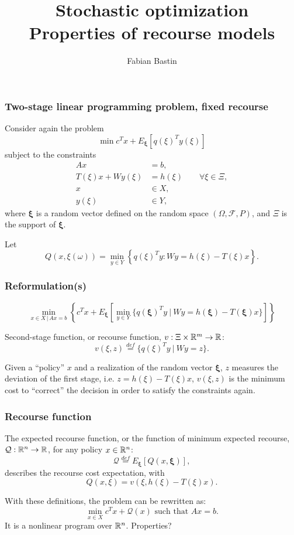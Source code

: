 \documentclass{beamer}
\title[Properties of recourse models]{Stochastic optimization\\Properties of recourse models}
\author{Fabian Bastin}
\date{}
\def\bxi{\boldsymbol\xi}
\def\bxi{\boldsymbol\xi}
\begin{document}
\frame{\titlepage}

\begin{frame}
\frametitle{Two-stage linear programming problem, fixed recourse}

Consider again the problem
\[
\min c^Tx + E_{\bxi}[q(\xi)^Ty(\xi)]
\]
subject to the constraints
\begin{align*}
Ax &= b, \\
T(\xi)x + Wy(\xi) &= h(\xi) \qquad \forall \xi \in \Xi, \\
x & \in X, \\
y(\xi) & \in Y,
\end{align*}
where $\bxi$ is a random vector defined on the random space 
$(\Omega, \mathcal{F}, P)$, and $\Xi$ is the support of $\bxi$.

\mbox{}

Let
\[
Q(x, \xi(\omega)) = \min_{y \in Y} \left\lbrace q(\xi)^Ty: Wy = h(\xi) - T(\xi)x \right\rbrace.
\]
\end{frame}

\begin{frame}
\frametitle{Reformulation(s)}

\[
\min_{x \in X \,|\, Ax = b} \left\lbrace c^Tx + E_{\bxi} \left[ \min_{y \in Y} \lbrace q(\bxi)^Ty \ |\ Wy = h(\bxi) - T(\bxi)x \rbrace \right] \right\rbrace 
\]

\mbox{}

Second-stage function, or recourse function, $v: \Xi \times \mathbb{R}^m \rightarrow \mathbb{R}$:
\[
v(\xi, z) \overset{def}{=} \lbrace q(\xi)^Ty \ |\ Wy = z \rbrace.
\]

Given a ``policy'' $x$ and a realization of the random vector $\bxi$, $z$ measures the deviation of the first stage, i.e. $z = h(\xi) - T(\xi)x$, $v(\xi, z)$ is the minimum cost to ``correct'' the decision in order to satisfy the constraints again.

\end{frame}

\begin{frame}
\frametitle{Recourse function}

The expected recourse function, or the function of minimum expected recourse, $\mathcal{Q}: \mathbb{R}^n \rightarrow \mathbb{R}$, for any policy $x \in \mathbb{R}^n$:
\[
\mathcal{Q} \overset{def}{=} E_{\bxi}[Q(x,\bxi)],
\]
describes the recourse cost expectation, with
\[
Q(x, \xi) = v(\xi, h(\xi)-T(\xi)x).
\]

\mbox{}

With these definitions, the problem can be rewritten as:
\[
\min_{x \in X} c^Tx + \mathcal{Q}(x) \mbox{ such that } Ax = b.
\]
It is a nonlinear program over $\mathbb{R}^n$. Properties?
\end{frame}
\end{document}
